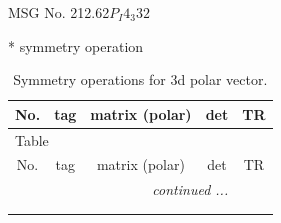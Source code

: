 \documentclass[fleqn,8pt]{jsarticle}
\begin{document}
\setcounter{MaxMatrixCols}{32}

\renewcommand{\tablename}{Table~}
\renewcommand{\figurename}{Figure~}
\begin{center}
\LARGE
MSG No. 212.62\quad$P_{I}4_{3}32$
\end{center}
* symmetry operation
\renewcommand{\arraystretch}{1.3}
\begin{longtable}{ccccc}
\caption{Symmetry operations for 3d polar vector.}
 \\
 \hline \hline
No. & tag & matrix (polar) & det & TR \\ \hline \endfirsthead

\multicolumn{4}{l}{\tablename\ \thetable{}} \\
 \hline \hline
No. & tag & matrix (polar) & det & TR \\ \hline \endhead

 \hline \hline
\multicolumn{4}{r}{\footnotesize\it continued ...} \\ \endfoot

 \hline \hline
\multicolumn{4}{r}{} \\ \endlastfoot


\end{longtable}
\end{document}
